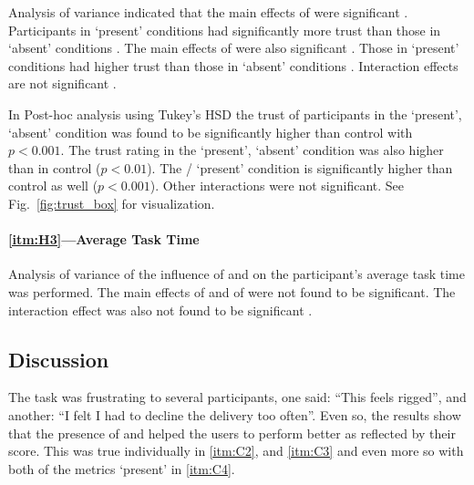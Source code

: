 Analysis of variance indicated that the main effects of \xQ{} were significant . Participants in \xQ{} `present' conditions  had significantly more trust than those in \xQ{} `absent' conditions . The main effects of \xO{} were also significant . Those in \xO{} `present' conditions  had higher trust than those in \xO{} `absent' conditions . Interaction effects are not significant .

In Post-hoc analysis using Tukey's HSD the trust of participants in the \xQ{} `present', \xO{} `absent' condition  was found to be significantly higher than control  with $p<0.001$. The trust rating in the \xO{} `present', \xQ{} `absent' condition  was also higher than in control ($p<0.01$). The \xQ/\xO{} `present' condition  is significantly higher than control as well ($p<0.001$). Other interactions were not significant. See Fig.~\ref{fig:trust_box} for visualization.

\paragraph{\ref{itm:H3}---Average Task Time}
Analysis of variance of the influence of \xQ{} and \xO{} on the participant's average task time was performed. The main effects of \xQ{}  and of \xO{}  were not found to be significant. The interaction effect was also not found to be significant .

\subsection{Discussion} \label{sec:discussion}
The task was frustrating to several participants, one said: ``This feels rigged'', and another: ``I felt I had to decline the delivery too often''. Even so, the results show that the presence of \xQ{} and \xO{} helped the users to perform better as reflected by their score. This was true individually in \ref{itm:C2}, and \ref{itm:C3} and even more so with both of the metrics `present' in \ref{itm:C4}. 

